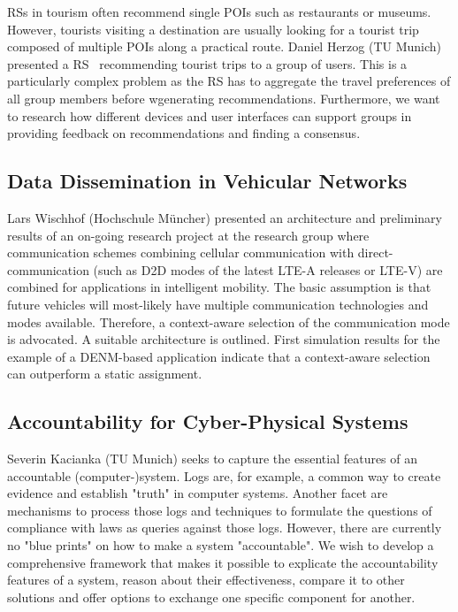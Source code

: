 \ac{RSs} in tourism often recommend single \ac{POIs} such as restaurants or
museums. However, tourists visiting a destination are usually looking for a
tourist trip composed of multiple \ac{POIs} along a practical route. Daniel
Herzog (TU Munich) presented a \ac{RS}~\cite{dherzog:it:2017} recommending
tourist trips to a group of users.  This is a particularly complex problem as
the \ac{RS} has to aggregate the travel preferences of all group members
before wgenerating recommendations.  Furthermore, we want to research how
different devices and user interfaces can support groups in providing feedback
on recommendations and finding a consensus.

\subsection{Data Dissemination in Vehicular Networks}

Lars Wischhof (Hochschule Müncher) presented an architecture and preliminary
results of an on-going research project at the research group where
communication schemes combining cellular communication with
direct-communication (such as \ac{D2D} modes of the latest LTE-A releases or
LTE-V) are combined for applications in intelligent mobility. The basic
assumption is that future vehicles will most-likely have multiple
communication technologies and modes available. Therefore, a context-aware
selection of the communication mode is advocated. A suitable architecture is
outlined. First simulation results for the example of a DENM-based application
indicate that a context-aware selection can outperform a static assignment.


\subsection{Accountability for Cyber-Physical Systems}

Severin Kacianka (TU Munich) seeks to capture the essential features of an
accountable (computer-)system.  Logs are, for example, a common way to create
evidence and establish  "truth" in computer systems. Another facet are
mechanisms to process those logs and techniques to formulate the questions of
compliance with laws as queries against those logs.  However, there are
currently no "blue prints" on how to make a system "accountable". We wish to
develop a comprehensive framework that makes it possible to explicate the
accountability features of a system, reason about their effectiveness, compare
it to other solutions and offer options to exchange one specific component for
another.


